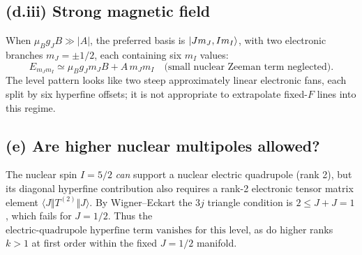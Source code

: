 \subsection*{(d.iii) Strong magnetic field}
When \(\mu_Bg_JB\gg|A|\), the preferred basis is
\(\left\lvert Jm_J,Im_I\right\rangle\), with two electronic branches
\(m_J=\pm1/2\), each containing six \(m_I\) values:
\[
E_{m_Jm_I}\simeq
\mu_Bg_Jm_JB+A\,m_Jm_I
\quad\text{(small nuclear Zeeman term neglected)}.
\]
The level pattern looks like two steep
approximately linear electronic fans,
each split by six hyperfine offsets; it is
not appropriate to extrapolate fixed-\(F\) lines
into this regime.

\subsection*{(e) Are higher nuclear multipoles allowed?}
The nuclear spin \(I=5/2\) \emph{can} support a
nuclear electric quadrupole (rank 2), but its
diagonal hyperfine contribution also requires a
rank-2 electronic tensor matrix element
\(\langle J\Vert T^{(2)}\Vert J\rangle\).
By Wigner--Eckart the \(3j\) triangle condition is
\(2\le J+J=1\), which fails for \(J=1/2\).
Thus the \(\boxed{\text{electric-quadrupole hyperfine
term vanishes for this level}}\), as do
higher ranks \(k>1\) at first order within
the fixed \(J=1/2\) manifold.
